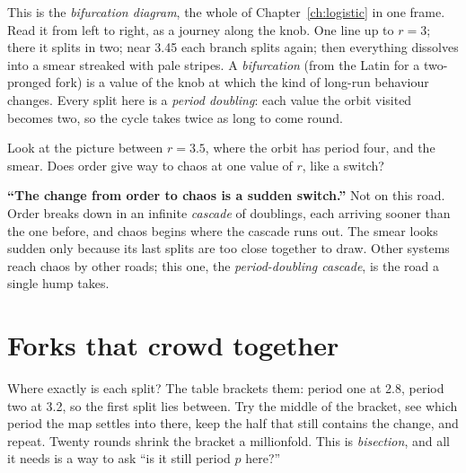 \noindent
This is the \emph{bifurcation diagram}, the whole of
Chapter~\ref{ch:logistic} in one frame. Read it from left to right, as a
journey along the knob. One line up to $r = 3$; there it splits in two; near
\num{3.45} each branch splits again; then everything dissolves into a smear
streaked with pale stripes. A \emph{bifurcation} (from the Latin for a
two-pronged fork) is a value of the knob at which the kind of long-run
behaviour changes. Every split here is a \emph{period doubling}: each value
the orbit visited becomes two, so the cycle takes twice as long to come
round.

\begin{think}
Look at the picture between $r = \num{3.5}$, where the orbit has period
four, and the smear. Does order give way to chaos at one value of $r$, like a
switch?
\end{think}

\begin{trapbox}
\textbf{\enquote{The change from order to chaos is a sudden switch.}} Not on
this road. Order breaks down in an infinite \emph{cascade} of doublings, each
arriving sooner than the one before, and chaos begins where the cascade runs
out. The smear looks sudden only because its last splits are too close
together to draw. Other systems reach chaos by other roads; this one, the
\emph{period-doubling cascade}, is the road a single hump takes.
\end{trapbox}

\section{Forks that crowd together}
\label{sec:ch08-cascade}

\noindent
Where exactly is each split? The table brackets them: period one at
\num{2.8}, period two at \num{3.2}, so the first split lies between. Try the
middle of the bracket, see which period the map settles into there, keep the
half that still contains the change, and repeat. Twenty rounds shrink the
bracket a millionfold. This is \emph{bisection}, and all it needs is a way to
ask \enquote{is it still period $p$ here?}



